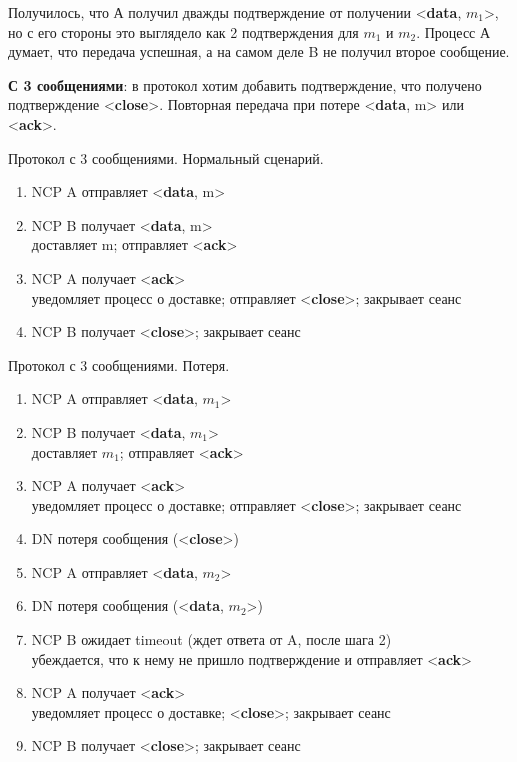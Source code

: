 Получилось, что А получил дважды подтверждение от получении <\textbf{data}, $m_1$>, но с его стороны это выглядело как 2 подтверждения для $m_1$ и $m_2$. Процесс А думает, что передача успешная, а на самом деле B не получил второе сообщение.

\newpage
\textbf{С 3 сообщениями}: в протокол хотим добавить подтверждение, что получено подтверждение <\textbf{close}>. Повторная передача при потере <\textbf{data}, m> или <\textbf{ack}>.

\begin{algorithm}
	\caption{Протокол с 3 сообщениями. Нормальный сценарий.}
	\begin{enumerate}
		\item NCP A отправляет <\textbf{data}, m>
		\item NCP B получает <\textbf{data}, m> \\
			доставляет m; отправляет <\textbf{ack}>
		\item NCP A получает <\textbf{ack}> \\
			уведомляет процесс о доставке; отправляет <\textbf{close}>; закрывает сеанс
		\item NCP B получает <\textbf{close}>; закрывает сеанс
	\end{enumerate}
\end{algorithm}

\begin{algorithm}[h!]
	\caption{Протокол с 3 сообщениями. Потеря.}
	\begin{enumerate}
		\item NCP A отправляет <\textbf{data}, $m_1$>
		\item NCP B получает <\textbf{data}, $m_1$> \\
			доставляет $m_1$; отправляет <\textbf{ack}>
		\item NCP A получает <\textbf{ack}> \\
			уведомляет процесс о доставке; отправляет <\textbf{close}>; закрывает сеанс
		\item DN потеря сообщения (<\textbf{close}>)
		\item NCP A отправляет <\textbf{data}, $m_2$>
		\item DN потеря сообщения (<\textbf{data}, $m_2$>)
		\item NCP B ожидает timeout (ждет ответа от A, после шага 2) \\
			убеждается, что к нему не пришло подтверждение  и отправляет <\textbf{ack}>
		\item NCP A получает <\textbf{ack}> \\
			уведомляет процесс о доставке; <\textbf{close}>; закрывает сеанс
		\item NCP B получает <\textbf{close}>; закрывает сеанс
	\end{enumerate}
\end{algorithm}


